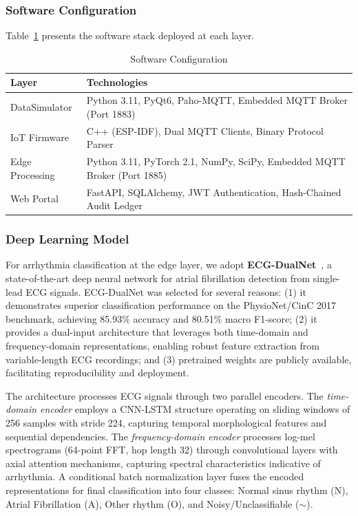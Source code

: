 \documentclass[10pt,twocolumn]{article}
\begin{document}
\subsubsection{Software Configuration}

Table~\ref{tab:software} presents the software stack deployed at each layer.

\begin{table}[htbp]
\centering
\caption{Software Configuration}
\label{tab:software}
\footnotesize
\begin{tabular}{@{}p{2cm}p{5.5cm}@{}}
\toprule
\textbf{Layer} & \textbf{Technologies} \\
\midrule
DataSimulator & Python 3.11, PyQt6, Paho-MQTT, Embedded MQTT Broker (Port 1883) \\
\addlinespace
IoT Firmware & C++ (ESP-IDF), Dual MQTT Clients, Binary Protocol Parser \\
\addlinespace
Edge Processing & Python 3.11, PyTorch 2.1, NumPy, SciPy, Embedded MQTT Broker (Port 1885) \\
\addlinespace
Web Portal & FastAPI, SQLAlchemy, JWT Authentication, Hash-Chained Audit Ledger \\
\bottomrule
\end{tabular}
\end{table}

\subsubsection{Deep Learning Model}

For arrhythmia classification at the edge layer, we adopt \textbf{ECG-DualNet}~\cite{rohr2022ecgdualnet}, a state-of-the-art deep neural network for atrial fibrillation detection from single-lead ECG signals. ECG-DualNet was selected for several reasons: (1) it demonstrates superior classification performance on the PhysioNet/CinC 2017 benchmark, achieving 85.93\% accuracy and 80.51\% macro F1-score; (2) it provides a dual-input architecture that leverages both time-domain and frequency-domain representations, enabling robust feature extraction from variable-length ECG recordings; and (3) pretrained weights are publicly available, facilitating reproducibility and deployment.

The architecture processes ECG signals through two parallel encoders. The \textit{time-domain encoder} employs a CNN-LSTM structure operating on sliding windows of 256 samples with stride 224, capturing temporal morphological features and sequential dependencies. The \textit{frequency-domain encoder} processes log-mel spectrograms (64-point FFT, hop length 32) through convolutional layers with axial attention mechanisms, capturing spectral characteristics indicative of arrhythmia. A conditional batch normalization layer fuses the encoded representations for final classification into four classes: Normal sinus rhythm (N), Atrial Fibrillation (A), Other rhythm (O), and Noisy/Unclassifiable ($\sim$).
\end{document}
